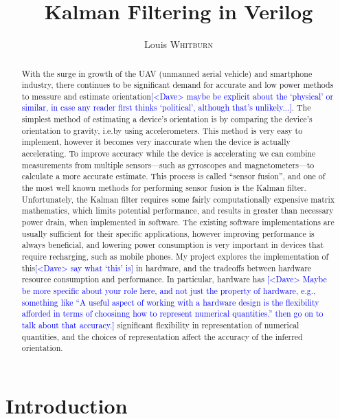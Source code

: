 \documentclass[12pt]{article}
\title{Kalman Filtering in Verilog}
\author{Louis \textsc{Whitburn}}
\newcommand{\note}[2][red]{\textcolor{#1}{#2}}
\newcommand{\notedme}[1]{\note[blue]{[<Dave> #1]}}
\begin{document}
\maketitle

\begin{abstract}

With the surge in growth of the UAV (unmanned aerial vehicle) and smartphone industry, there continues to be significant demand for accurate and low power methods to measure and estimate orientation\notedme{maybe be explicit about the `physical' or similar, in case any reader first thinks `political', although that's unlikely...}. The simplest method of estimating a device's orientation is by comparing the device's orientation to gravity, i.e.\@ by using accelerometers. This method is very easy to implement, however it becomes very inaccurate when the device is actually accelerating. To improve accuracy while the device is accelerating we can combine measurements from multiple sensors---such as gyroscopes and magnetometers---to calculate a more accurate estimate. This process is called ``sensor fusion'', and one of the most well known methods for performing sensor fusion is the Kalman filter. Unfortunately, the Kalman filter requires some fairly computationally expensive matrix mathematics, which limits potential performance, and results in greater than necessary power drain, when implemented in software. The existing software implementations are usually sufficient for their specific applications, however improving performance is always beneficial, and lowering power consumption is very important in devices that require recharging, such as mobile phones. My project explores the implementation of this\notedme{say what `this' is} in hardware, and the tradeoffs between hardware resource consumption and performance. In particular, hardware has \notedme{Maybe be more specific about your role here, and not just the property of hardware, e.g., something like ``A useful aspect of working with a hardware design is the flexibility afforded in terms of choosinng how to represent numerical quantities.'' then go on to talk about that accuracy.} significant flexibility in representation of numerical quantities, and the choices of representation affect the accuracy of the inferred orientation.

\end{abstract}

\section{Introduction}
\end{document}
